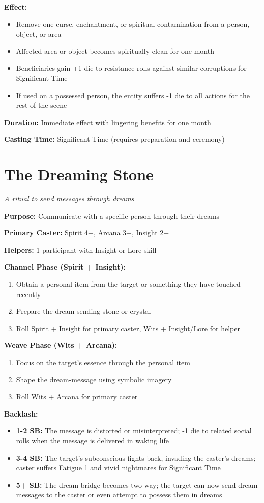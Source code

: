 \textbf{Effect:}
\begin{itemize}
\item Remove one curse, enchantment, or spiritual contamination from a person, object, or area
\item Affected area or object becomes spiritually clean for one month
\item Beneficiaries gain +1 die to resistance rolls against similar corruptions for Significant Time
\item If used on a possessed person, the entity suffers -1 die to all actions for the rest of the scene
\end{itemize}

\textbf{Duration:} Immediate effect with lingering benefits for one month

\textbf{Casting Time:} Significant Time (requires preparation and ceremony)

\section*{The Dreaming Stone}
\textit{A ritual to send messages through dreams}

\textbf{Purpose:} Communicate with a specific person through their dreams

\textbf{Primary Caster:} Spirit 4+, Arcana 3+, Insight 2+

\textbf{Helpers:} 1 participant with Insight or Lore skill

\textbf{Channel Phase (Spirit + Insight):}
\begin{enumerate}
\item Obtain a personal item from the target or something they have touched recently
\item Prepare the dream-sending stone or crystal
\item Roll Spirit + Insight for primary caster, Wits + Insight/Lore for helper
\end{enumerate}

\textbf{Weave Phase (Wits + Arcana):}
\begin{enumerate}
\item Focus on the target's essence through the personal item
\item Shape the dream-message using symbolic imagery
\item Roll Wits + Arcana for primary caster
\end{enumerate}

\textbf{Backlash:}
\begin{itemize}
\item \textbf{1-2 SB:} The message is distorted or misinterpreted; -1 die to related social rolls when the message is delivered in waking life
\item \textbf{3-4 SB:} The target's subconscious fights back, invading the caster's dreams; caster suffers Fatigue 1 and vivid nightmares for Significant Time
\item \textbf{5+ SB:} The dream-bridge becomes two-way; the target can now send dream-messages to the caster or even attempt to possess them in dreams
\end{itemize}


